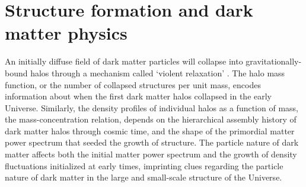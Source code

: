 \section{Structure formation and dark matter physics}
\indent An initially diffuse field of dark matter particles will collapse into gravitationally-bound halos through a mechanism called `violent relaxation' \citep{LyndenBell67}. The halo mass function, or the number of collapsed structures per unit mass, encodes information about when the first dark matter halos collapsed in the early Universe. Similarly, the density profiles of individual halos as a function of mass, the mass-concentration relation, depends on the hierarchical assembly history of dark matter halos through cosmic time, and the shape of the primordial matter power spectrum that seeded the growth of structure. The particle nature of dark matter affects both the initial matter power spectrum and the growth of density fluctuations initialized at early times, imprinting clues regarding the particle nature of dark matter in the large and small-scale structure of the Universe. 

